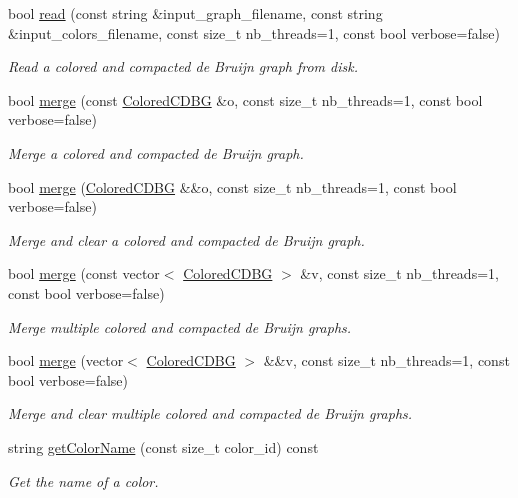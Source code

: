 \begin{DoxyCompactItemize}
bool \hyperlink{classColoredCDBG_a513ae8190f56a26b088a99e1e33689d8}{read} (const string \&input\+\_\+graph\+\_\+filename, const string \&input\+\_\+colors\+\_\+filename, const size\+\_\+t nb\+\_\+threads=1, const bool verbose=false)
\begin{DoxyCompactList}\small\item\em Read a colored and compacted de Bruijn graph from disk. \end{DoxyCompactList}\item 
bool \hyperlink{classColoredCDBG_a4242b53d2b0d7b28a038ad6d89b42db7}{merge} (const \hyperlink{classColoredCDBG}{Colored\+C\+D\+BG} \&o, const size\+\_\+t nb\+\_\+threads=1, const bool verbose=false)
\begin{DoxyCompactList}\small\item\em Merge a colored and compacted de Bruijn graph. \end{DoxyCompactList}\item 
bool \hyperlink{classColoredCDBG_af15dc622a1c16cb8ec0f7b1a1dc2dcd8}{merge} (\hyperlink{classColoredCDBG}{Colored\+C\+D\+BG} \&\&o, const size\+\_\+t nb\+\_\+threads=1, const bool verbose=false)
\begin{DoxyCompactList}\small\item\em Merge and clear a colored and compacted de Bruijn graph. \end{DoxyCompactList}\item 
bool \hyperlink{classColoredCDBG_a2b62245a0edcf177fd33680bfa3a3178}{merge} (const vector$<$ \hyperlink{classColoredCDBG}{Colored\+C\+D\+BG} $>$ \&v, const size\+\_\+t nb\+\_\+threads=1, const bool verbose=false)
\begin{DoxyCompactList}\small\item\em Merge multiple colored and compacted de Bruijn graphs. \end{DoxyCompactList}\item 
bool \hyperlink{classColoredCDBG_a6820d9b88fcb3d1c0ce970bbe8478bab}{merge} (vector$<$ \hyperlink{classColoredCDBG}{Colored\+C\+D\+BG} $>$ \&\&v, const size\+\_\+t nb\+\_\+threads=1, const bool verbose=false)
\begin{DoxyCompactList}\small\item\em Merge and clear multiple colored and compacted de Bruijn graphs. \end{DoxyCompactList}\item 
string \hyperlink{classColoredCDBG_addda923f3d4f213ffd3a572163c410f8}{get\+Color\+Name} (const size\+\_\+t color\+\_\+id) const
\begin{DoxyCompactList}\small\item\em Get the name of a color. \end{DoxyCompactList}\item 

\end{DoxyCompactItemize}
